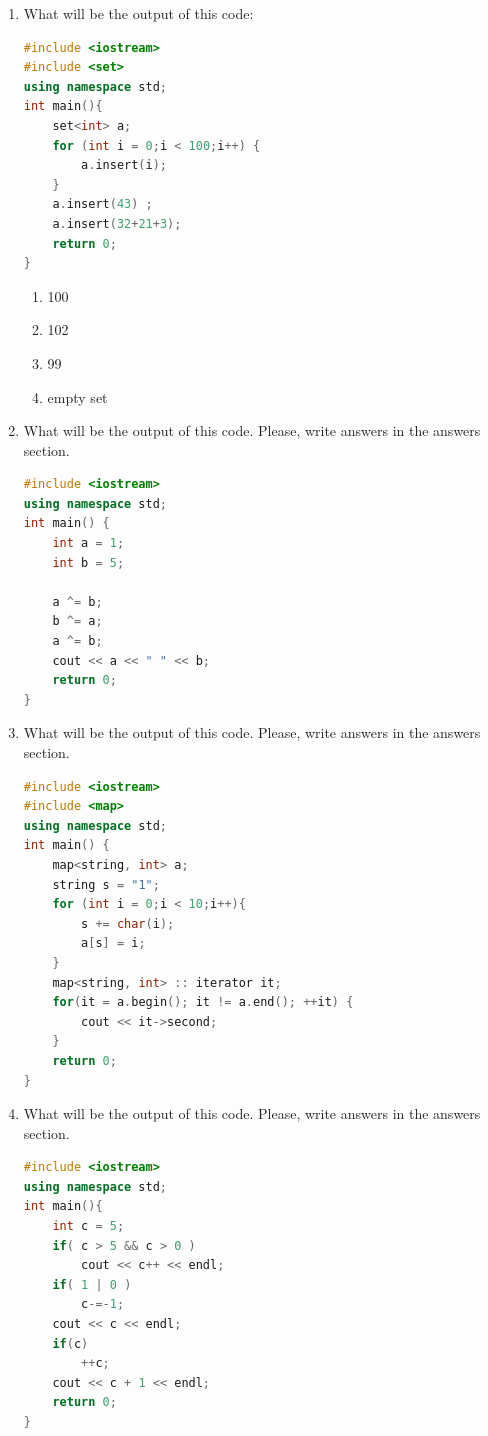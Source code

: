 \documentclass[10pt]{article}
\begin{document}
\begin{enumerate}
\item What will be the output of this code:
\begin{lstlisting}[language=C++]
#include <iostream>
#include <set>
using namespace std;
int main(){
    set<int> a;
    for (int i = 0;i < 100;i++) {
        a.insert(i);    
    }
    a.insert(43) ;
    a.insert(32+21+3);
    return 0;
}
\end{lstlisting}
\begin{multicols}{4}
\begin{enumerate}
    \item 100
    \item 102
    \item 99
    \item empty set
\end{enumerate}
\end{multicols}






\item What will be the output of this code. Please, write answers in the answers section.
\begin{lstlisting}[language=C++]
#include <iostream> 
using namespace std; 
int main() { 
    int a = 1;
    int b = 5;

    a ^= b;
    b ^= a; 
    a ^= b;
	cout << a << " " << b;
    return 0;
}
\end{lstlisting}






\item What will be the output of this code. Please, write answers in the answers section.
\begin{lstlisting}[language=C++]
#include <iostream> 
#include <map>
using namespace std; 
int main() { 
    map<string, int> a;
    string s = "1";
    for (int i = 0;i < 10;i++){
        s += char(i);
        a[s] = i;
    }
    map<string, int> :: iterator it;
    for(it = a.begin(); it != a.end(); ++it) {
        cout << it->second;
    }
    return 0;
}
\end{lstlisting}


\item What will be the output of this code. Please, write answers in the answers section.
\begin{lstlisting}[language=C++]
#include <iostream>
using namespace std;
int main(){
    int c = 5;
    if( c > 5 && c > 0 )
        cout << c++ << endl;
    if( 1 | 0 )
        c-=-1;
    cout << c << endl;
    if(c)
        ++c;
    cout << c + 1 << endl;
    return 0;
}
\end{lstlisting}






\end{enumerate}
\end{document}
